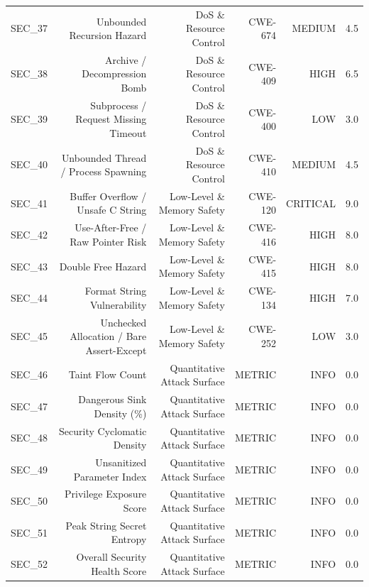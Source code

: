 \begin{table}[htbp]
\begin{tabular}{lrrrrr}
SEC\_37 & Unbounded Recursion Hazard & DoS \& Resource Control & CWE-674 & MEDIUM & 4.5 \\
SEC\_38 & Archive / Decompression Bomb & DoS \& Resource Control & CWE-409 & HIGH & 6.5 \\
SEC\_39 & Subprocess / Request Missing Timeout & DoS \& Resource Control & CWE-400 & LOW & 3.0 \\
SEC\_40 & Unbounded Thread / Process Spawning & DoS \& Resource Control & CWE-410 & MEDIUM & 4.5 \\
SEC\_41 & Buffer Overflow / Unsafe C String & Low-Level \& Memory Safety & CWE-120 & CRITICAL & 9.0 \\
SEC\_42 & Use-After-Free / Raw Pointer Risk & Low-Level \& Memory Safety & CWE-416 & HIGH & 8.0 \\
SEC\_43 & Double Free Hazard & Low-Level \& Memory Safety & CWE-415 & HIGH & 8.0 \\
SEC\_44 & Format String Vulnerability & Low-Level \& Memory Safety & CWE-134 & HIGH & 7.0 \\
SEC\_45 & Unchecked Allocation / Bare Assert-Except & Low-Level \& Memory Safety & CWE-252 & LOW & 3.0 \\
SEC\_46 & Taint Flow Count & Quantitative Attack Surface & METRIC & INFO & 0.0 \\
SEC\_47 & Dangerous Sink Density (\%) & Quantitative Attack Surface & METRIC & INFO & 0.0 \\
SEC\_48 & Security Cyclomatic Density & Quantitative Attack Surface & METRIC & INFO & 0.0 \\
SEC\_49 & Unsanitized Parameter Index & Quantitative Attack Surface & METRIC & INFO & 0.0 \\
SEC\_50 & Privilege Exposure Score & Quantitative Attack Surface & METRIC & INFO & 0.0 \\
SEC\_51 & Peak String Secret Entropy & Quantitative Attack Surface & METRIC & INFO & 0.0 \\
SEC\_52 & Overall Security Health Score & Quantitative Attack Surface & METRIC & INFO & 0.0 \\
\hline
\end{tabular}
\end{table}
